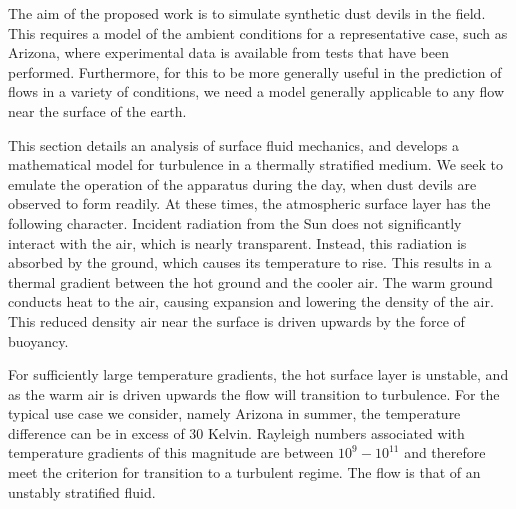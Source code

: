 \label{sec:mathmodel}


%
%

The aim of the proposed work is to simulate synthetic
dust devils in the field. This requires a model of the ambient
conditions for a representative case, such as Arizona, where
experimental data is available from tests that have been
performed. Furthermore, for this to be more generally useful in the
prediction of flows in a variety of conditions, we need a model generally
applicable to any flow near the surface of the earth.  

This section details an analysis of surface fluid mechanics, and
develops a mathematical model for turbulence in a thermally stratified
medium. We seek to emulate the operation of the apparatus during the
day, when dust devils are observed to form readily. 
At these times, the atmospheric surface layer has the following
character. Incident radiation from the Sun does not significantly
interact with the air, which is nearly transparent. Instead, this
radiation is absorbed by the ground, which causes its temperature to
rise. This results in a thermal gradient between the hot ground and the
cooler air. The warm ground conducts heat to the air, causing expansion
and lowering the density of the air. This reduced density air near the
surface is driven upwards by the force of buoyancy.  

For sufficiently large temperature gradients, the hot surface layer is
unstable, and as the warm air is driven upwards the flow will transition
to turbulence. For the typical use case we consider, namely Arizona in
summer, the temperature difference can be in excess of 30 Kelvin. 
Rayleigh numbers associated with temperature gradients of this magnitude
are between $10^{9} - 10^{11}$ and therefore meet the criterion
for transition to a turbulent regime. The flow is that of an unstably
stratified fluid.  

